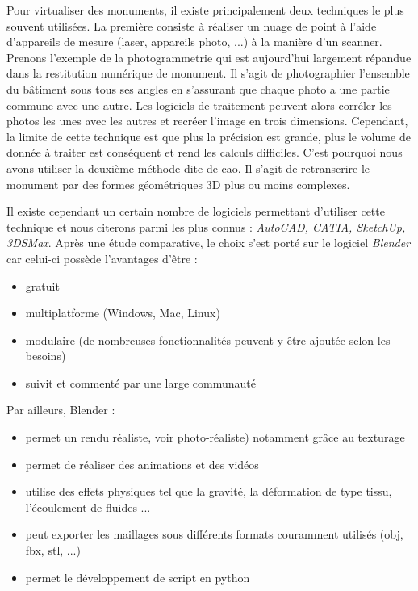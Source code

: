 Pour virtualiser des monuments, il existe principalement deux techniques le plus souvent utilisées. La première consiste à réaliser un nuage de point à l'aide d'appareils de mesure (laser, appareils photo, ...) à la manière d'un scanner. Prenons l'exemple de la photogrammetrie qui est aujourd'hui largement répandue dans la restitution numérique de monument. Il s'agit de photographier l'ensemble du bâtiment sous tous ses angles en s'assurant que chaque photo a une partie commune avec une autre. Les logiciels de traitement peuvent alors corréler les photos les unes avec les autres et recréer l'image en trois dimensions. Cependant, la limite de cette technique est que plus la précision est grande, plus le volume de donnée à traiter est conséquent et rend les calculs difficiles. C'est pourquoi nous avons utiliser la deuxième méthode dite de \gls{cao}. Il s'agit de retranscrire le monument par des formes géométriques 3D plus ou moins complexes.

Il existe cependant un certain nombre de logiciels permettant d'utiliser cette technique et nous citerons parmi les plus connus : \textit{AutoCAD, CATIA, SketchUp, 3DSMax}. Après une étude comparative, le choix s'est porté sur le logiciel \textit{Blender} car celui-ci possède l'avantages d'être :

\begin{itemize}
	\item gratuit
	\item multiplatforme (Windows, Mac, Linux)
	\item modulaire (de nombreuses fonctionnalités peuvent y être ajoutée selon les besoins)
	\item suivit et commenté par une large communauté
\end{itemize}

Par ailleurs, Blender : 
\begin{itemize}
	\item permet un rendu réaliste, voir photo-réaliste) notamment grâce au texturage
	\item permet de réaliser des animations et des vidéos
	\item utilise des effets physiques tel que la gravité, la déformation de type tissu, l'écoulement de fluides ...
	\item peut exporter les maillages sous différents formats couramment utilisés (obj, fbx, stl, ...)
	\item permet le développement de script en python
\end{itemize}

